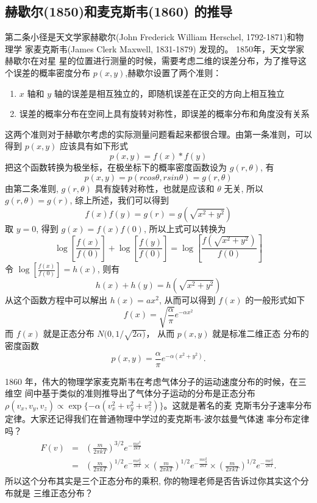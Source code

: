 \subsection{赫歇尔(1850)和麦克斯韦(1860) 的推导}

第二条小径是天文学家赫歇尔(John Frederick William Herschel, 1792-1871)和物理学
家麦克斯韦(James Clerk Maxwell, 1831-1879) 发现的。 1850年，天文学家赫歇尔在对星
星的位置进行测量的时候，需要考虑二维的误差分布，为了推导这个误差的概率密度分布
$p(x,y)$,赫歇尔设置了两个准则：
\begin{enumerate}
\item $x$ 轴和 $y$ 轴的误差是相互独立的，即随机误差在正交的方向上相互独立
\item 误差的概率分布在空间上具有旋转对称性，即误差的概率分布和角度没有关系
\end{enumerate}
这两个准则对于赫歇尔考虑的实际测量问题看起来都很合理。由第一条准则，可以得到
$p(x,y)$ 应该具有如下形式
$$ p(x,y) = f(x) * f(y) $$
把这个函数转换为极坐标，在极坐标下的概率密度函数设为 $g(r,\theta)$, 有
$$ p(x,y) =  p(rcos\theta, rsin\theta) = g(r,\theta)$$
由第二条准则, $g(r,\theta)$ 具有旋转对称性，也就是应该和 $\theta$ 无关, 所以 $g(r,\theta)=g(r)$,
综上所述，我们可以得到
$$ f(x)f(y) = g(r) = g(\sqrt{x^2+y^2}) $$
取 $y=0$, 得到 $g(x) = f(x)f(0)$, 所以上式可以转换为
$$ \log\left[\frac{f(x)}{f(0)}\right] + \log\left[\frac{f(y)}{f(0)}\right]
= \log\left[\frac{f(\sqrt{x^2+y^2})}{f(0)}\right] $$
令 $\log\left[\frac{f(x)}{f(0)}\right] = h(x) $, 则有
$$ h(x) + h(y) = h(\sqrt{x^2+y^2}) $$
从这个函数方程中可以解出 $h(x) = ax^2$, 从而可以得到 $f(x)$ 的一般形式如下
$$ f(x) = \sqrt{\frac{\alpha}{\pi}} e^{-\alpha x^2} $$
而 $f(x)$ 就是正态分布 $N(0, 1/\sqrt{2\alpha)}$， 从而 $p(x,y)$ 就是标准二维正态
分布的密度函数
$$ p(x,y) = \frac{\alpha}{\pi} e^{-\alpha (x^2+y^2)}. $$

1860 年，伟大的物理学家麦克斯韦在考虑气体分子的运动速度分布的时候，在三维空
间中基于类似的准则推导出了气体分子运动的分布是正态分布
$\rho(v_x,v_y,v_z) \propto \exp\{-\alpha(v_x^2+v_y^2+v_z^2)\} $。这就是著名的麦
克斯韦分子速率分布定律。大家还记得我们在普通物理中学过的麦克斯韦-波尔兹曼气体速
率分布定律吗？
\begin{eqnarray}
\label{maxwell}
\begin{array}{lll}
F(v) & = & \displaystyle \left(\frac{m}{2\pi kT}\right)^{3/2} e^{-\frac{mv^2}{2kT}} \\
& = & \displaystyle  \left(\frac{m}{2\pi kT}\right)^{1/2} e^{-\frac{mv_x^2}{2kT}}
                     \times \left(\frac{m}{2\pi kT}\right)^{1/2} e^{-\frac{mv_y^2}{2kT}}
                     \times \left(\frac{m}{2\pi kT}\right)^{1/2} e^{-\frac{mv_z^2}{2kT}} .
\end{array}
\end{eqnarray}
所以这个分布其实是三个正态分布的乘积, 你的物理老师是否告诉过你其实这个分布就是
三维正态分布？

